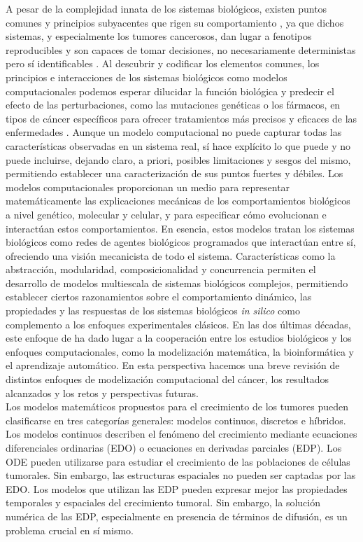 A pesar de la complejidad innata de los sistemas biológicos, existen puntos comunes y principios subyacentes que rigen su comportamiento \cite{Hartwell1999}, ya que dichos sistemas, y especialmente los tumores cancerosos, dan lugar a fenotipos reproducibles y son capaces de tomar decisiones, no necesariamente deterministas pero sí identificables \cite{Hartman2001, Siegal2002}. Al descubrir y codificar los elementos comunes, los principios e interacciones de los sistemas biológicos como modelos computacionales podemos esperar dilucidar la función biológica y predecir el efecto de las perturbaciones, como las mutaciones genéticas o los fármacos, en tipos de cáncer específicos para ofrecer tratamientos más precisos y eficaces de las enfermedades \cite{DiVentura2006}. Aunque un modelo computacional no puede capturar todas las características observadas en un sistema real, sí hace explícito lo que puede y no puede incluirse, dejando claro, a priori, posibles limitaciones y sesgos del mismo, permitiendo establecer una caracterización de sus puntos fuertes y débiles. Los modelos computacionales proporcionan un medio para representar matemáticamente las explicaciones mecánicas de los comportamientos biológicos a nivel genético, molecular y celular, y para especificar cómo evolucionan e interactúan estos comportamientos. En esencia, estos modelos tratan los sistemas biológicos como redes de agentes biológicos programados que interactúan entre sí, ofreciendo una visión mecanicista de todo el sistema. Características como la abstracción, modularidad, composicionalidad y concurrencia permiten el desarrollo de modelos multiescala de sistemas biológicos complejos, permitiendo establecer ciertos razonamientos sobre el comportamiento dinámico, las propiedades y las respuestas de los sistemas biológicos \textit{in silico} como complemento a los enfoques experimentales clásicos. En las dos últimas décadas, este enfoque de ha dado lugar a la cooperación entre los estudios biológicos y los enfoques computacionales, como la modelización matemática, la bioinformática y el aprendizaje automático. En esta perspectiva hacemos una breve revisión de distintos enfoques de modelización computacional del cáncer, los resultados alcanzados y los retos y perspectivas futuras.\\

Los modelos matemáticos propuestos para el crecimiento de los tumores pueden clasificarse en tres categorías generales: modelos continuos, discretos e híbridos. Los modelos continuos describen el fenómeno del crecimiento mediante ecuaciones diferenciales ordinarias (EDO) o ecuaciones en derivadas parciales (EDP). Los ODE pueden utilizarse para estudiar el crecimiento de las poblaciones de células tumorales. Sin embargo, las estructuras espaciales no pueden ser captadas por las EDO. Los modelos que utilizan las EDP pueden expresar mejor las propiedades temporales y espaciales del crecimiento tumoral. Sin embargo, la solución numérica de las EDP, especialmente en presencia de términos de difusión, es un problema crucial en sí mismo.\\

